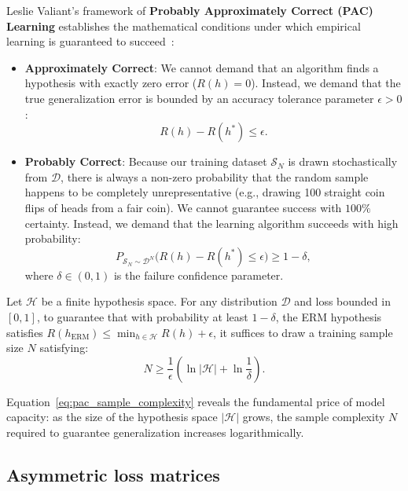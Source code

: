 Leslie Valiant's framework of \textbf{Probably Approximately Correct (PAC) Learning} establishes the mathematical conditions under which empirical learning is guaranteed to succeed~\cite{shalev2014understanding}:
\begin{itemize}
  \item \textbf{Approximately Correct}: We cannot demand that an algorithm finds a hypothesis with exactly zero error ($R(h) = 0$). Instead, we demand that the true generalization error is bounded by an accuracy tolerance parameter $\epsilon > 0$:
  \begin{equation}
  R(h) - R(h^*) \le \epsilon.
  \end{equation}
  \item \textbf{Probably Correct}: Because our training dataset $\mathcal{S}_N$ is drawn stochastically from $\mathcal{D}$, there is always a non-zero probability that the random sample happens to be completely unrepresentative (e.g., drawing 100 straight coin flips of heads from a fair coin). We cannot guarantee success with $100\%$ certainty. Instead, we demand that the learning algorithm succeeds with high probability:
  \begin{equation}
  P_{\mathcal{S}_N \sim \mathcal{D}^N}\Big( R(h) - R(h^*) \le \epsilon \Big) \ge 1 - \delta,
  \label{eq:pac_guarantee}
  \end{equation}
  where $\delta \in (0, 1)$ is the failure confidence parameter.
\end{itemize}

\begin{theorem}
Let $\mathcal{H}$ be a finite hypothesis space. For any distribution $\mathcal{D}$ and loss bounded in $[0, 1]$, to guarantee that with probability at least $1 - \delta$, the ERM hypothesis satisfies $R(h_{\text{ERM}}) \le \min_{h \in \mathcal{H}} R(h) + \epsilon$, it suffices to draw a training sample size $N$ satisfying:
\begin{equation}
N \ge \frac{1}{\epsilon} \left( \ln |\mathcal{H}| + \ln \frac{1}{\delta} \right).
\label{eq:pac_sample_complexity}
\end{equation}
\end{theorem}
Equation~\eqref{eq:pac_sample_complexity} reveals the fundamental price of model capacity: as the size of the hypothesis space $|\mathcal{H}|$ grows, the sample complexity $N$ required to guarantee generalization increases logarithmically.

\subsection{Asymmetric loss matrices}
\label{sec:asymmetric_cost_matrix}

